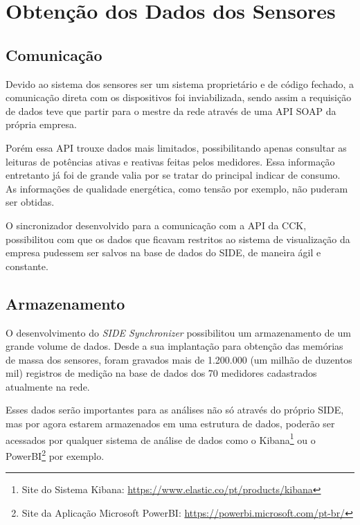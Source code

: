 \chapter{Obtenção dos Dados dos Sensores}
\label{c:obtencao_dos_dados_dos_sensores}

\section{Comunicação}

Devido ao sistema dos sensores ser um sistema proprietário e de código fechado, a comunicação direta com os dispositivos foi inviabilizada, sendo assim a requisição de dados teve que partir para o mestre da rede através de uma API SOAP da própria empresa.

Porém essa API trouxe dados mais limitados, possibilitando apenas consultar as leituras de potências ativas e reativas feitas pelos medidores. Essa informação entretanto já foi de grande valia por se tratar do principal indicar de consumo. As informações de qualidade energética, como tensão por exemplo, não puderam ser obtidas.

O sincronizador desenvolvido para a comunicação com a API da CCK, possibilitou com que os dados que ficavam restritos ao sistema de visualização da empresa pudessem ser salvos na base de dados do SIDE, de maneira ágil e constante.

\section{Armazenamento}

O desenvolvimento do \textit{SIDE Synchronizer} possibilitou um armazenamento de um grande volume de dados. Desde a sua implantação para obtenção das memórias de massa dos sensores, foram gravados mais de 1.200.000 (um milhão de duzentos mil) registros de medição na base de dados dos 70 medidores cadastrados atualmente na rede. 

Esses dados serão importantes para as análises não só através do próprio SIDE, mas por agora estarem armazenados em uma estrutura de dados, poderão ser acessados por qualquer sistema de análise de dados como o Kibana\footnote{Site do Sistema Kibana: \url{https://www.elastic.co/pt/products/kibana}} ou o PowerBI\footnote{Site da Aplicação Microsoft PowerBI: \url{https://powerbi.microsoft.com/pt-br/}} por exemplo.

